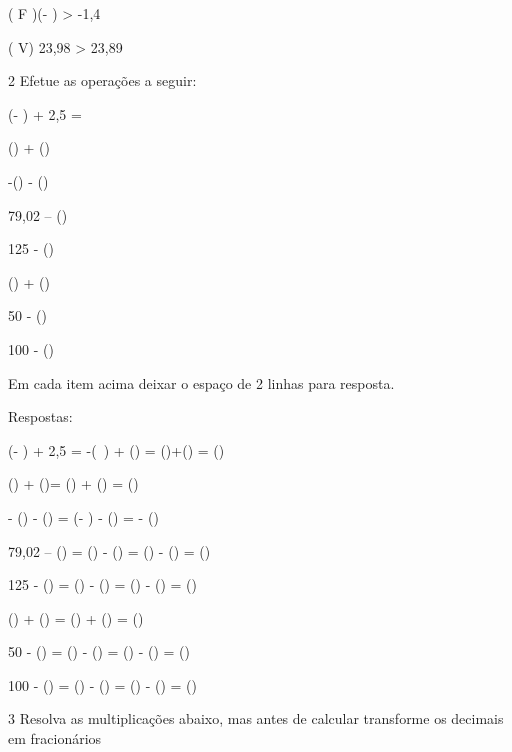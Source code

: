 ( F )(- ) \textgreater{} -1,4

( V) 23,98 \textgreater{} 23,89

\num{2} Efetue as operações a seguir:

\item (- ) + 2,5 =
\item () + ()
\item -() - ()
\item 79,02 -- ()
\item 125 - ()
\item () + ()
\item 50 - ()
\item 100 - ()

Em cada item acima deixar o espaço de 2 linhas para resposta.

Respostas:

\item (- ) + 2,5 = -(\ ) + () =
()+() = ()

\item () + ()= () +
() = ()

\item - () - () = (- ) -
() = - ()

\item 79,02 -- () = () - ()
= () - () = ()

\item 125 - () = () - () =
() - () = ()

\item () + () = () +
() = ()

\item 50 - () = () - () =
() - () = ()

\item 100 - () = () - () =
() - () = ()

\num{3} Resolva as multiplicações abaixo, mas antes de calcular transforme os
decimais em fracionários

